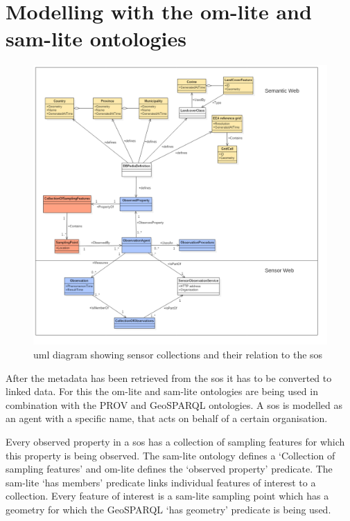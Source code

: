 \section{Modelling with the om-lite and sam-lite ontologies}
\begin{figure}
	\centering
	\includegraphics[width=1\linewidth]{UML/SensorLinks3.png}
	\caption{\ac{uml} diagram showing sensor collections and their relation to the \ac{sos}}
	\label{fig:UML}
\end{figure}

After the metadata has been retrieved from the \ac{sos} it has to be converted to linked data. For this the om-lite and sam-lite ontologies are being used in combination with the PROV and GeoSPARQL ontologies. A \ac{sos} is modelled as an agent with a specific name, that acts on behalf of a certain organisation. 

Every observed property in a \ac{sos} has a collection of sampling features for which this property is being observed. The sam-lite ontology defines a `Collection of sampling features' and om-lite defines the `observed property' predicate. The sam-lite `has members' predicate links individual features of interest to a collection. Every feature of interest is a sam-lite sampling point which has a geometry for which the GeoSPARQL `has geometry' predicate is being used. 

